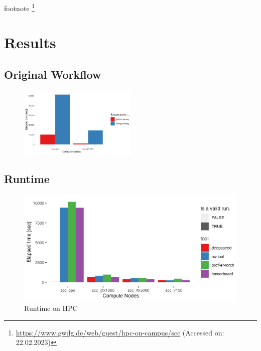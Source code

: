 \documentclass[12pt, a4paper, hidelinks]{article}
\begin{document}
footnote \footnote{\url{https://www.gwdg.de/web/guest/hpc-on-campus/scc} (Accessed on: 22.02.2023)}

\section{Results}
\label{sec:results}

\subsection{Original Workflow}
\label{sec:r-original-workflow}



\begin{figure}[H]
\centering
\includegraphics[width=0.5\textwidth]{./assets/sacct_barplot_by_nodes_sample-points-effect}
\caption*{}
\label{fig:sacct_barplot_by_nodes_sample-points-effect}
\end{figure}

\subsection{Runtime}
\label{sec:r-runtime}




\begin{figure}[H]
\centering
\includegraphics[width=1\textwidth]{./assets/sacct_barplot_by_nodes_no-experiment}
\caption*{Runtime on HPC}
\label{fig:sacct_barplot_by_nodes_no-experiment}
\end{figure}
\end{document}
